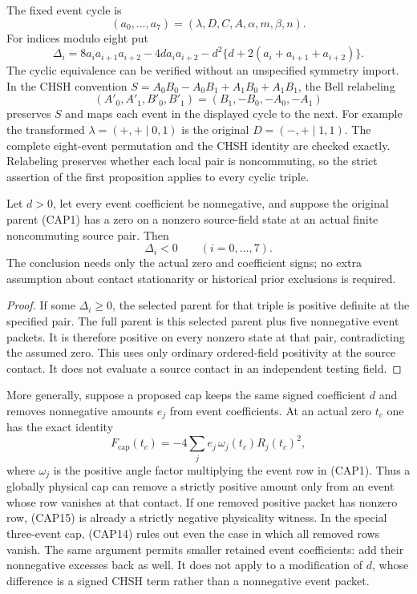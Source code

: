 The fixed event cycle is
\[
(a_0,\ldots,a_7)=(\lambda,D,C,A,\alpha,m,\beta,n).
\]
For indices modulo eight put
\[
\Delta_i=8a_i a_{i+1}a_{i+2}-4d a_i a_{i+2}
 -d^2\{d+2(a_i+a_{i+1}+a_{i+2})\}.
\tag{CAP12}
\]
The cyclic equivalence can be verified without an unspecified symmetry
import.  In the CHSH convention
$S=A_0B_0-A_0B_1+A_1B_0+A_1B_1$, the Bell relabeling
\[
(A'_0,A'_1,B'_0,B'_1)=(B_1,-B_0,-A_0,-A_1)
\tag{CAP13}
\]
preserves $S$ and maps each event in the displayed cycle to the next.
For example the transformed $\lambda=(+,+\mid0,1)$ is the original
$D=(-,+\mid1,1)$.  The complete eight-event permutation and the CHSH
identity are checked exactly.  Relabeling preserves whether each local
pair is noncommuting, so the strict assertion of the first proposition
applies to every cyclic triple.

\begin{theorem}
Let $d>0$, let every event coefficient be nonnegative, and suppose
the original parent (CAP1) has a zero on a nonzero source-field state
at an actual finite noncommuting source pair.  Then
\[
\Delta_i<0\qquad (i=0,\ldots,7).
\tag{CAP14}
\]
The conclusion needs only the actual zero and coefficient signs;
no extra assumption about contact stationarity or historical prior
exclusions is required.
\end{theorem}

\begin{proof}
If some $\Delta_i\geq0$, the selected parent for that triple is
positive definite at the specified pair.  The full parent is this
selected parent plus five nonnegative event packets.  It is therefore
positive on every nonzero state at that pair, contradicting the
assumed zero.  This uses only ordinary ordered-field positivity at
the source contact.  It does not evaluate a source contact in an
independent testing field.
\end{proof}

More generally, suppose a proposed cap keeps the same signed coefficient
$d$ and removes nonnegative amounts $e_j$ from event coefficients.
At an actual zero $t_c$ one has the exact identity
\[
F_{\mathrm{cap}}(t_c)
 =-4\sum_j e_j\,\omega_j(t_c)R_j(t_c)^2,
\tag{CAP15}
\]
where $\omega_j$ is the positive angle factor multiplying the event
row in (CAP1).  Thus a globally physical cap can remove a strictly
positive amount only from an event whose row vanishes at that contact.
If one removed positive packet has nonzero row, (CAP15) is already a
strictly negative physicality witness.  In the special three-event cap,
(CAP14) rules out even the case in which all removed rows vanish.
The same argument permits smaller retained event coefficients: add
their nonnegative excesses back as well.  It does not apply to a
modification of $d$, whose difference is a signed CHSH term rather
than a nonnegative event packet.

